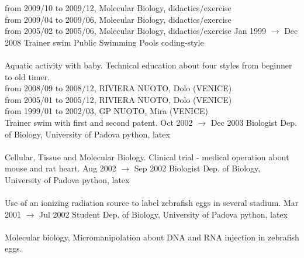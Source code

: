 \documentclass[9pt]{stackoverflow} %
\begin{document}
\begin{tcolorbox}
{\begin{entrylist}
{		from 2009/10 to 2009/12, Molecular Biology, didactics/exercise\\
		from 2009/04 to 2009/06, Molecular Biology, didactics/exercise\\
		from 2005/02 to 2005/06, Molecular Biology, didactics/exercise}
	\entry
		{Jan 1999 $\rightarrow$ Dec 2008}
		{Trainer swim}
		{Public Swimming Pools}
		{{coding-style}\\\\
		Aquatic activity with baby. Technical education about four styles from beginner to old timer.\\
		from 2008/09 to 2008/12, RIVIERA NUOTO, Dolo (VENICE)\\
		from 2005/01 to 2005/12, RIVIERA NUOTO, Dolo (VENICE)\\
		from 1999/01 to 2002/03, GP NUOTO, Mira (VENICE)\\
		Trainer swim with first and second patent.}
	\entry
		{Oct 2002 $\rightarrow$ Dec 2003}
		{Biologist}
		{Dep. of Biology, University of Padova}
		{{python, latex}\\\\
		Cellular, Tissue and Molecular Biology. Clinical trial - medical operation about mouse and rat heart.}
	\entry
		{Aug 2002 $\rightarrow$ Sep 2002}
		{Biologist}
		{Dep. of Biology, University of Padova}
		{{python, latex}\\\\
		Use of an ionizing radiation source to label zebrafish eggs in several stadium.}
	\entry
		{Mar 2001 $\rightarrow$ Jul 2002}
		{Student}
		{Dep. of Biology, University of Padova}
		{{python, latex}\\\\
		Molecular biology, Micromanipolation about DNA and RNA injection in zebrafish eggs.}
\end{entrylist}}
\end{tcolorbox}

\end{document}
